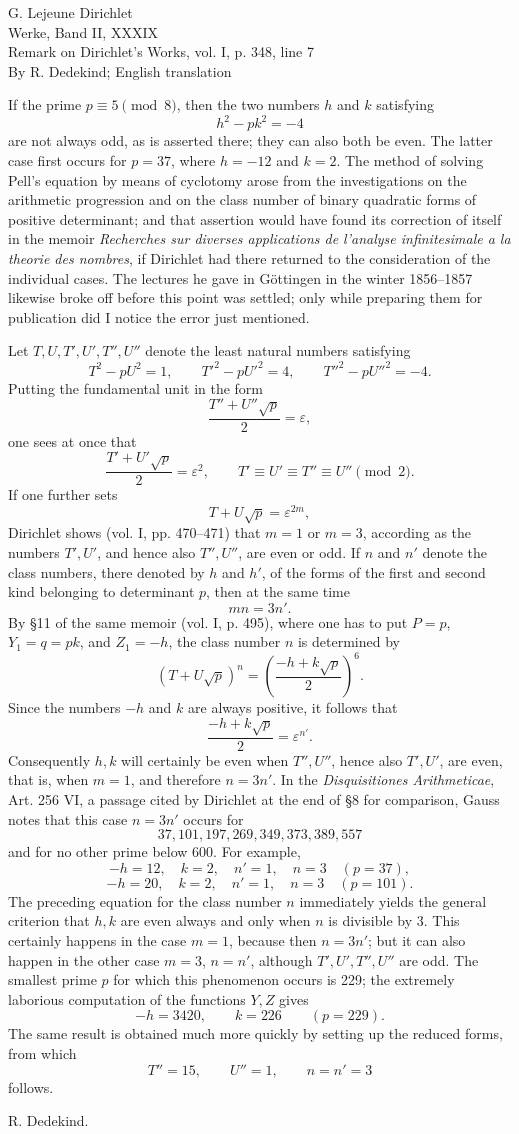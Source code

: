 \documentclass[11pt]{article}
\newcommand{\paperhead}[3]{\begin{center}{\Large G. Lejeune Dirichlet}\\[0.25em]{\large Werke, Band II, #1}\\[0.75em]{\LARGE #2}\\[0.35em]{\large #3}\end{center}\bigskip}
\newcommand{\sign}[1]{\begin{flushright}#1\end{flushright}}
\begin{document}
\paperhead{XXXIX}{Remark on Dirichlet's Works, vol. I, p. 348, line 7}{By R. Dedekind; English translation}

If the prime \(p\equiv 5\pmod 8\), then the two numbers \(h\) and \(k\) satisfying
\[
h^2-pk^2=-4
\]
are not always odd, as is asserted there; they can also both be even. The latter case first occurs for \(p=37\), where \(h=-12\) and \(k=2\). The method of solving Pell's equation by means of cyclotomy arose from the investigations on the arithmetic progression and on the class number of binary quadratic forms of positive determinant; and that assertion would have found its correction of itself in the memoir \emph{Recherches sur diverses applications de l'analyse infinitesimale a la theorie des nombres}, if Dirichlet had there returned to the consideration of the individual cases. The lectures he gave in Göttingen in the winter 1856--1857 likewise broke off before this point was settled; only while preparing them for publication did I notice the error just mentioned.

Let \(T,U,T',U',T'',U''\) denote the least natural numbers satisfying
\[
T^2-pU^2=1,
\qquad
T'^2-pU'^2=4,
\qquad
T''^2-pU''^2=-4.
\]
Putting the fundamental unit in the form
\[
\frac{T''+U''\sqrt p}{2}=\varepsilon,
\]
one sees at once that
\[
\frac{T'+U'\sqrt p}{2}=\varepsilon^2,
\qquad
T'\equiv U'\equiv T''\equiv U''\pmod 2.
\]
If one further sets
\[
T+U\sqrt p=\varepsilon^{2m},
\]
Dirichlet shows (vol. I, pp. 470--471) that \(m=1\) or \(m=3\), according as the numbers \(T',U'\), and hence also \(T'',U''\), are even or odd. If \(n\) and \(n'\) denote the class numbers, there denoted by \(h\) and \(h'\), of the forms of the first and second kind belonging to determinant \(p\), then at the same time
\[
mn=3n'.
\]
By \S 11 of the same memoir (vol. I, p. 495), where one has to put \(P=p\), \(Y_1=q=pk\), and \(Z_1=-h\), the class number \(n\) is determined by
\[
(T+U\sqrt p)^n=
\left(\frac{-h+k\sqrt p}{2}\right)^6.
\]
Since the numbers \(-h\) and \(k\) are always positive, it follows that
\[
\frac{-h+k\sqrt p}{2}=\varepsilon^{n'}.
\]
Consequently \(h,k\) will certainly be even when \(T'',U''\), hence also \(T',U'\), are even, that is, when \(m=1\), and therefore \(n=3n'\). In the \emph{Disquisitiones Arithmeticae}, Art. 256 VI, a passage cited by Dirichlet at the end of \S 8 for comparison, Gauss notes that this case \(n=3n'\) occurs for
\[
37,101,197,269,349,373,389,557
\]
and for no other prime below 600. For example,
\[
-h=12,
\quad k=2,
\quad n'=1,
\quad n=3
\quad (p=37),
\]
\[
-h=20,
\quad k=2,
\quad n'=1,
\quad n=3
\quad (p=101).
\]
The preceding equation for the class number \(n\) immediately yields the general criterion that \(h,k\) are even always and only when \(n\) is divisible by 3. This certainly happens in the case \(m=1\), because then \(n=3n'\); but it can also happen in the other case \(m=3\), \(n=n'\), although \(T',U',T'',U''\) are odd. The smallest prime \(p\) for which this phenomenon occurs is 229; the extremely laborious computation of the functions \(Y,Z\) gives
\[
-h=3420,
\qquad
k=226
\qquad
(p=229).
\]
The same result is obtained much more quickly by setting up the reduced forms, from which
\[
T''=15,
\qquad U''=1,
\qquad n=n'=3
\]
follows.
\sign{R. Dedekind.}
\end{document}
